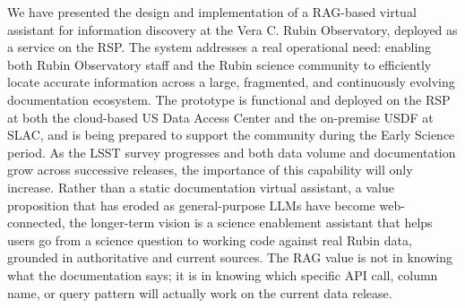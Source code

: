 We have presented the design and implementation of a \gls{RAG}-based virtual assistant for information discovery at the Vera C. Rubin Observatory, deployed as a service on the \gls{RSP}.
The system addresses a real operational need: enabling both Rubin  Observatory staff and the Rubin science community to efficiently locate accurate information across a large, fragmented, and continuously evolving documentation ecosystem.
The prototype is functional and deployed on the RSP at both the cloud-based US Data Access Center and the on-premise USDF at SLAC, and is being prepared to support the community during the Early Science period.
As the \gls{LSST} survey progresses and both data volume and documentation grow across successive releases, the importance of this capability will only increase.
Rather than a static documentation virtual assistant, a value proposition that has eroded as general-purpose LLMs have become web-connected, the longer-term vision is a science enablement assistant that helps users go from a science question to working code against real Rubin data, grounded in authoritative and current sources.
The \gls{RAG} value is not in knowing what the documentation says; it is in knowing which specific API call, column name, or query pattern will actually work on the current data release.
